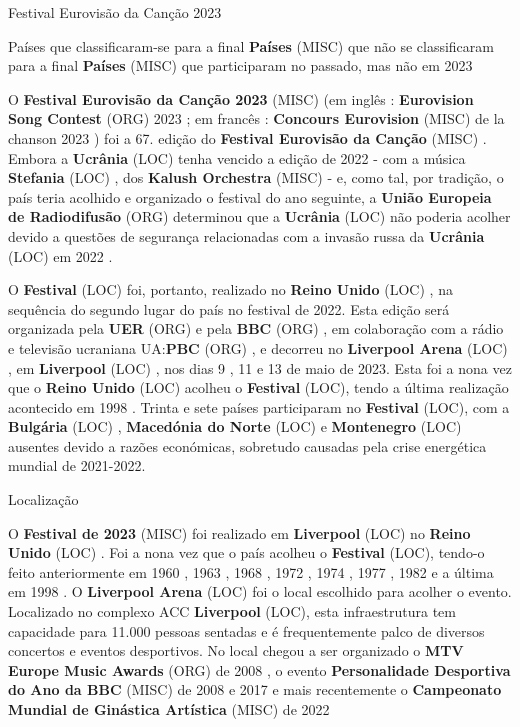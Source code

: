 \documentclass[12pt,a4paper]{article}
\begin{document}
Festival Eurovisão da Canção 2023



Países que classificaram-se para a final \textbf{Países} (MISC) que não se classificaram para a final \textbf{Países} (MISC) que participaram no passado, mas não em 2023

O \textbf{Festival Eurovisão da Canção 2023} (MISC) (em inglês : \textbf{Eurovision Song Contest} (ORG) 2023 ; em francês : \textbf{Concours Eurovision} (MISC) de la chanson 2023 ) foi a 67. edição do \textbf{Festival Eurovisão da Canção} (MISC) . Embora a \textbf{Ucrânia} (LOC) tenha vencido a edição de 2022 - com a música  \textbf{Stefania} (LOC) , dos \textbf{Kalush Orchestra} (MISC) - e, como tal, por tradição, o país teria acolhido e organizado o festival do ano seguinte, a \textbf{União Europeia de Radiodifusão} (ORG) determinou que a \textbf{Ucrânia} (LOC) não poderia acolher devido a questões de segurança relacionadas com a invasão russa da \textbf{Ucrânia} (LOC) em 2022 .

O \textbf{Festival} (LOC) foi, portanto, realizado no \textbf{Reino Unido} (LOC) , na sequência do segundo lugar do país no festival de 2022. Esta edição será organizada pela \textbf{UER} (ORG) e pela \textbf{BBC} (ORG) , em colaboração com a rádio e televisão ucraniana UA:\textbf{PBC} (ORG) , e decorreu no \textbf{Liverpool Arena} (LOC) , em \textbf{Liverpool} (LOC) , nos dias 9 , 11 e 13 de maio de 2023. Esta foi a nona vez que o \textbf{Reino Unido} (LOC) acolheu o \textbf{Festival} (LOC), tendo a última realização acontecido em 1998 . Trinta e sete países participaram no \textbf{Festival} (LOC), com a \textbf{Bulgária} (LOC) , \textbf{Macedónia do Norte} (LOC) e \textbf{Montenegro} (LOC) ausentes devido a razões económicas, sobretudo causadas pela crise energética mundial de 2021-2022.



Localização

O \textbf{Festival de 2023} (MISC) foi realizado em \textbf{Liverpool} (LOC) no \textbf{Reino Unido} (LOC) . Foi a nona vez que o país acolheu o \textbf{Festival} (LOC), tendo-o feito anteriormente em 1960 , 1963 , 1968 , 1972 , 1974 , 1977 , 1982 e a última em 1998 . O \textbf{Liverpool Arena} (LOC) foi o local escolhido para acolher o evento. Localizado no complexo ACC \textbf{Liverpool} (LOC), esta infraestrutura tem capacidade para 11.000 pessoas sentadas e é frequentemente palco de diversos concertos e eventos desportivos. No local chegou a ser organizado o \textbf{MTV Europe Music Awards} (ORG) de 2008 , o evento \textbf{Personalidade Desportiva do Ano da BBC} (MISC) de 2008 e 2017 e mais recentemente o \textbf{Campeonato Mundial de Ginástica Artística} (MISC) de 2022
\end{document}
